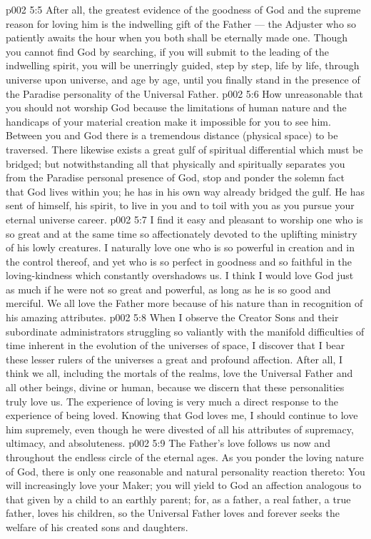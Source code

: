 \vs p002 5:5 After all, the greatest evidence of the goodness of God and the supreme reason for loving him is the indwelling gift of the Father --- the Adjuster who so patiently awaits the hour when you both shall be eternally made one. Though you cannot find God by searching, if you will submit to the leading of the indwelling spirit, you will be unerringly guided, step by step, life by life, through universe upon universe, and age by age, until you finally stand in the presence of the Paradise personality of the Universal Father.
\vs p002 5:6 \pc How unreasonable that you should not worship God because the limitations of human nature and the handicaps of your material creation make it impossible for you to see him. Between you and God there is a tremendous distance (physical space) to be traversed. There likewise exists a great gulf of spiritual differential which must be bridged; but notwithstanding all that physically and spiritually separates you from the Paradise personal presence of God, stop and ponder the solemn fact that God lives within you; he has in his own way already bridged the gulf. He has sent of himself, his spirit, to live in you and to toil with you as you pursue your eternal universe career.
\vs p002 5:7 I find it easy and pleasant to worship one who is so great and at the same time so affectionately devoted to the uplifting ministry of his lowly creatures. I naturally love one who is so powerful in creation and in the control thereof, and yet who is so perfect in goodness and so faithful in the loving\hyp{}kindness which constantly overshadows us. I think I would love God just as much if he were not so great and powerful, as long as he is so good and merciful. We all love the Father more because of his nature than in recognition of his amazing attributes.
\vs p002 5:8 When I observe the Creator Sons and their subordinate administrators struggling so valiantly with the manifold difficulties of time inherent in the evolution of the universes of space, I discover that I bear these lesser rulers of the universes a great and profound affection. After all, I think we all, including the mortals of the realms, love the Universal Father and all other beings, divine or human, because we discern that these personalities truly love us. The experience of loving is very much a direct response to the experience of being loved. Knowing that God loves me, I should continue to love him supremely, even though he were divested of all his attributes of supremacy, ultimacy, and absoluteness.
\vs p002 5:9 The Father’s love follows us now and throughout the endless circle of the eternal ages. As you ponder the loving nature of God, there is only one reasonable and natural personality reaction thereto: You will increasingly love your Maker; you will yield to God an affection analogous to that given by a child to an earthly parent; for, as a father, a real father, a true father, loves his children, so the Universal Father loves and forever seeks the welfare of his created sons and daughters.
